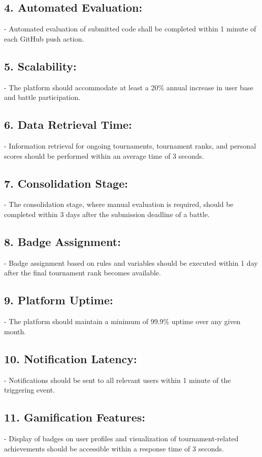 \subsection*{4. Automated Evaluation:}
   - Automated evaluation of submitted code shall be completed within 1 minute of each GitHub push action.

\subsection*{5. Scalability:}
   - The platform should accommodate at least a 20\% annual increase in user base and battle participation.

\subsection*{6. Data Retrieval Time:}
   - Information retrieval for ongoing tournaments, tournament ranks, and personal scores should be performed within an average time of 3 seconds.

\subsection*{7. Consolidation Stage:}
   - The consolidation stage, where manual evaluation is required, should be completed within 3 days after the submission deadline of a battle.

\subsection*{8. Badge Assignment:}
   - Badge assignment based on rules and variables should be executed within 1 day after the final tournament rank becomes available.

\subsection*{9. Platform Uptime:}
   - The platform should maintain a minimum of 99.9\% uptime over any given month.

\subsection*{10. Notification Latency:}
    - Notifications should be sent to all relevant users within 1 minute of the triggering event.

\subsection*{11. Gamification Features:}
    - Display of badges on user profiles and visualization of tournament-related achievements should be accessible within a response time of 3 seconds.

